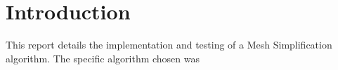 \chapter{Introduction}

  This report details the implementation and testing of a Mesh Simplification
  algorithm.  The specific algorithm chosen was 
